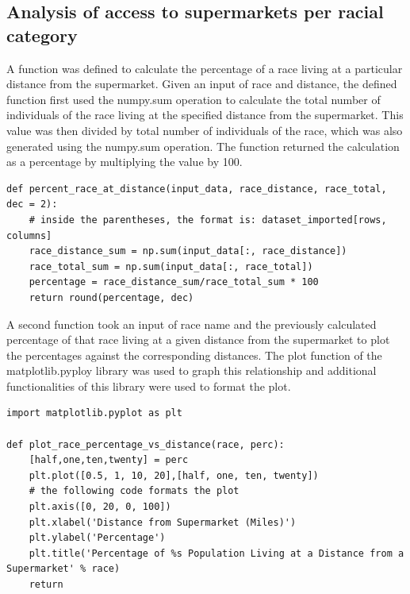 \documentclass[letterpaper]{article} %
\begin{document}
\subsection{Analysis of access to supermarkets per racial category}

A function was defined to calculate the percentage of a race living at a particular distance from the supermarket. Given an input of race and distance, the defined function first used the numpy.sum operation to calculate the total number of individuals of the race living at the specified distance from the supermarket. This value was then divided by total number of individuals of the race, which was also generated using the numpy.sum operation. The function returned the calculation as a percentage by multiplying the value by 100.
\vspace{0.25cm} %

\lstset{language=Python}
\begin{lstlisting}[frame=single] 
def percent_race_at_distance(input_data, race_distance, race_total, dec = 2):
    # inside the parentheses, the format is: dataset_imported[rows, columns]
    race_distance_sum = np.sum(input_data[:, race_distance])
    race_total_sum = np.sum(input_data[:, race_total])
    percentage = race_distance_sum/race_total_sum * 100
    return round(percentage, dec)

\end{lstlisting}

A second function took an input of race name and the previously calculated percentage of that race living at a given distance from the supermarket to plot the percentages against the corresponding distances. The plot function of the matplotlib.pyploy library was used to graph this relationship and additional functionalities of this library were used to format the plot.
\vspace{0.25cm}

\lstset{language=Python}
\begin{lstlisting}[frame=single]
import matplotlib.pyplot as plt

def plot_race_percentage_vs_distance(race, perc):
    [half,one,ten,twenty] = perc
    plt.plot([0.5, 1, 10, 20],[half, one, ten, twenty])
    # the following code formats the plot
    plt.axis([0, 20, 0, 100])
    plt.xlabel('Distance from Supermarket (Miles)')
    plt.ylabel('Percentage')
    plt.title('Percentage of %s Population Living at a Distance from a Supermarket' % race)
    return

\end{lstlisting}
\end{document}

